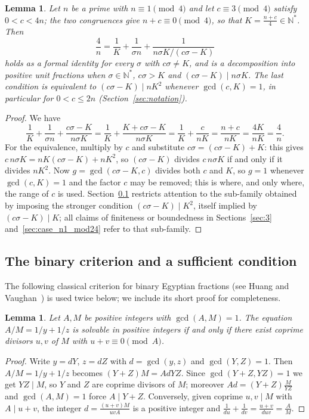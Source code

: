 \documentclass[11pt, a4paper]{article}
\theoremstyle{plain}
\newtheorem{lemma}[theorem]{Lemma}
\theoremstyle{definition}
\newcommand{\N}{\mathbb{N}}
\begin{document}
\begin{lemma}\label{lem:3.1}
Let $n$ be a prime with $n\equiv1\pmod 4$ and let $c \equiv 3 \pmod{4}$ satisfy $0<c<4n$; the two congruences give $n+c\equiv0\pmod 4$, so that $K = \frac{n+c}{4} \in \N^*$. Then
$$ \frac{4}{n} = \frac{1}{K} + \frac{1}{\sigma n} + \frac{1}{n\sigma K/(c\sigma - K)} $$
holds as a formal identity for every $\sigma$ with $c\sigma \neq K$, and is a decomposition into positive unit fractions when $\sigma \in \N^*$, $c\sigma > K$ and $(c\sigma - K) \mid n\sigma K$. The last condition is equivalent to $(c\sigma-K)\mid nK^{2}$ whenever $\gcd(c,K)=1$, in particular for $0<c\le2n$ (Section~\ref{sec:notation}).
\end{lemma}
\begin{proof}
We have
$$ \frac{1}{K} + \frac{1}{\sigma n} + \frac{c\sigma-K}{n\sigma K} = \frac{1}{K} + \frac{K + c\sigma - K}{n\sigma K} = \frac{1}{K} + \frac{c}{nK} = \frac{n+c}{nK} = \frac{4K}{nK} = \frac{4}{n}. $$
For the equivalence, multiply by $c$ and substitute $c\sigma = (c\sigma - K) + K$: this gives $c\,n\sigma K = nK(c\sigma - K) + nK^2$, so $(c\sigma-K)$ divides $c\,n\sigma K$ if and only if it divides $nK^2$. Now $g=\gcd(c\sigma-K,c)$ divides both $c$ and $K$, so $g=1$ whenever $\gcd(c,K)=1$ and the factor $c$ may be removed; this is where, and only where, the range of $c$ is used. Section~\ref{sec:3.2} restricts attention to the sub-family obtained by imposing the stronger condition $(c\sigma-K)\mid K^{2}$, itself implied by $(c\sigma-K)\mid K$; all claims of finiteness or boundedness in Sections~\ref{sec:3} and~\ref{sec:case_n1_mod24} refer to that sub-family.
\end{proof}

\subsection{The binary criterion and a sufficient condition}\label{sec:3.2}

The following classical criterion for binary Egyptian fractions (see Huang and Vaughan~\cite{huang_vaughan}) is used twice below; we include its short proof for completeness.

\begin{lemma}\label{lem:binary}
Let $A,M$ be positive integers with $\gcd(A,M)=1$. The equation $A/M=1/y+1/z$ is solvable in positive integers if and only if there exist \emph{coprime} divisors $u,v$ of $M$ with $u+v\equiv0\pmod A$.
\end{lemma}
\begin{proof}
Write $y=dY$, $z=dZ$ with $d=\gcd(y,z)$ and $\gcd(Y,Z)=1$. Then $A/M=1/y+1/z$ becomes $(Y+Z)M=AdYZ$. Since $\gcd(Y+Z,YZ)=1$ we get $YZ\mid M$, so $Y$ and $Z$ are coprime divisors of $M$; moreover $Ad=(Y+Z)\frac{M}{YZ}$ and $\gcd(A,M)=1$ force $A\mid Y+Z$. Conversely, given coprime $u,v\mid M$ with $A\mid u+v$, the integer $d=\frac{(u+v)M}{uvA}$ is a positive integer and $\frac1{du}+\frac1{dv}=\frac{u+v}{duv}=\frac AM$.
\end{proof}
\end{document}
